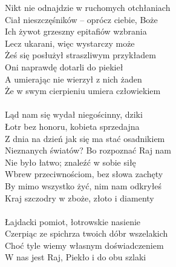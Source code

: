 \documentclass[a5paper, 10pt]{book}
\begin{document}
\newpage
\begin{minipage}[t]{0.7\textwidth}

\hspace*{4mm} Nikt nie odnajdzie w ruchomych otchłaniach\\
\hspace*{4mm} Ciał nieszczęśników – oprócz ciebie, Boże\\
\hspace*{4mm} Ich żywot grzeszny epitafiów wzbrania\\
\hspace*{4mm} Lecz ukarani, więc wystarczy może\\
\hspace*{4mm} Żeś się posłużył straszliwym przykładem\\
\hspace*{4mm} Oni naprawdę dotarli do piekieł\\
\hspace*{4mm} A umierając nie wierzył z nich żaden\\
\hspace*{4mm} Że w swym cierpieniu umiera człowiekiem\\
\\

Ląd nam się wydał niegościnny, dziki\\
Łotr bez honoru, kobieta sprzedajna\\
Z dnia na dzień jak się ma stać osadnikiem\\
Nieznanych światów? Bo rozpoznać Raj nam\\
Nie było łatwo; znaleźć w sobie siłę\\
Wbrew przeciwnościom, bez słowa zachęty\\
By mimo wszystko żyć, nim nam odkryłeś\\
Kraj szczodry w zboże, złoto i diamenty\\
\\

\hspace*{4mm} Łajdacki pomiot, łotrowskie nasienie\\
\hspace*{4mm} Czerpiąc ze spichrza twoich dóbr wszelakich\\
\hspace*{4mm} Choć tyle wiemy własnym doświadczeniem\\
\hspace*{4mm} W nas jest Raj, Piekło i do obu szlaki\\
\\
\end{minipage}
\end{document}
